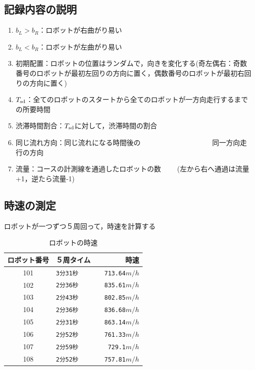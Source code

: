 \documentclass[twocolumn]{jarticle} %
\begin{document}
\subsection{記録内容の説明}

\begin{enumerate}
\item $b_L>b_R$：ロボットが右曲がり易い
\item $b_L<b_R$：ロボットが左曲がり易い
\item 初期配置：ロボットの位置はランダムで，向きを変化する(奇左偶右：奇数番号のロボットが最初左回りの方向に置く，偶数番号のロボットが最初右回りの方向に置く)
\item $T_{\rm sd}$：全てのロボットのスタートから全てのロボットが一方向走行するまでの所要時間
\item 渋滞時間割合：$T_{\rm sd}$に対して，渋滞時間の割合
\item 同じ流れ方向：同じ流れになる時間後の
　　　　　　　　　　同一方向走行の方向
\item 流量：コースの計測線を通過したロボットの数
　　(左から右へ通過は流量+1，逆たら流量-1)
\end{enumerate}

\subsection{時速の測定}
ロボットが一つずつ５周回って，時速を計算する
\begin{table}[!ht]
\begin{center}
\begin{tabular}{|c|l|r|}
\hline
ロボット番号 &  ５周タイム　&　時速　\\
\hline
101 & \verb|3分31秒|  &  \verb|713.64|$m/h$ \\
102 & \verb|2分36秒|  &  \verb|835.61|$m/h$ \\
103 & \verb|2分43秒|  &  \verb|802.85|$m/h$ \\
104 & \verb|2分36秒|  &  \verb|836.68|$m/h$ \\
105 & \verb|2分31秒|  &  \verb|863.14|$m/h$ \\
106 & \verb|2分52秒|  &  \verb|761.33|$m/h$ \\
107 & \verb|2分59秒|  &  \verb|729.1|$m/h$ \\
108 & \verb|2分52秒|  &  \verb|757.81|$m/h$ \\
\hline
\end{tabular}
\end{center}
\caption{
ロボットの時速
}
\end{table}
\end{document}
